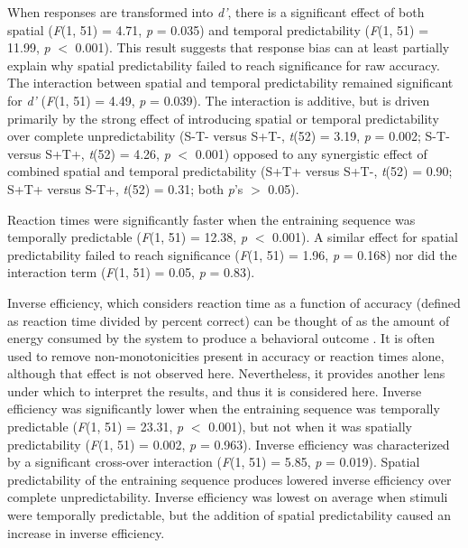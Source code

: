 \documentclass[dwyatte_dissertation.tex]{subfiles}
\begin{document}
When responses are transformed into \textit{d'}, there is a significant effect of both spatial (\textit{F}(1, 51) = 4.71, \textit{p} = 0.035) and temporal predictability (\textit{F}(1, 51) = 11.99, \textit{p} $<$ 0.001). This result suggests that response bias can at least partially explain why spatial predictability failed to reach significance for raw accuracy. The interaction between spatial and temporal predictability remained significant for \textit{d'} (\textit{F}(1, 51) = 4.49, \textit{p} = 0.039). The interaction is additive, but is driven primarily by the strong effect of introducing spatial or temporal predictability over complete unpredictability (S-T- versus S+T-, \textit{t}(52) = 3.19, \textit{p} = 0.002; S-T- versus S+T+, \textit{t}(52) = 4.26, \textit{p} $<$ 0.001) opposed to any synergistic effect of combined spatial and temporal predictability (S+T+ versus S+T-, \textit{t}(52) = 0.90; S+T+ versus S-T+, \textit{t}(52) = 0.31; both \textit{p}'s $>$ 0.05).

Reaction times were significantly faster when the entraining sequence was temporally predictable (\textit{F}(1, 51) = 12.38, \textit{p} $<$ 0.001). A similar effect for spatial predictability failed to reach significance (\textit{F}(1, 51) = 1.96, \textit{p} = 0.168) nor did the interaction term (\textit{F}(1, 51) = 0.05, \textit{p} = 0.83).

Inverse efficiency, which considers reaction time as a function of accuracy (defined as reaction time divided by percent correct) can be thought of as the amount of energy consumed by the system to produce a behavioral outcome \cite{TownshendAshby83}. It is often used to remove non-monotonicities present in accuracy or reaction times alone, although that effect is not observed here. Nevertheless, it provides another lens under which to interpret the results, and thus it is considered here. Inverse efficiency was significantly lower when the entraining sequence was temporally predictable (\textit{F}(1, 51) = 23.31, \textit{p} $<$ 0.001), but not when it was spatially predictability (\textit{F}(1, 51) = 0.002, \textit{p} = 0.963). Inverse efficiency was characterized by a significant cross-over interaction (\textit{F}(1, 51) = 5.85, \textit{p} = 0.019). Spatial predictability of the entraining sequence produces lowered inverse efficiency over complete unpredictability. Inverse efficiency was lowest on average when stimuli were temporally predictable, but the addition of spatial predictability caused an increase in inverse efficiency.
\end{document}
